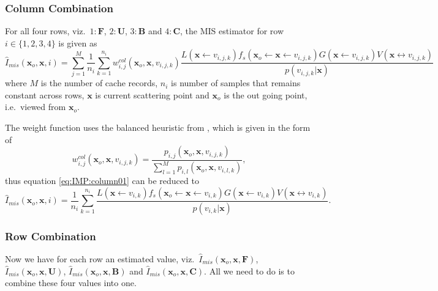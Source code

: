 \documentclass[]{book}
\begin{document}
\subsubsection*{Column Combination}
For all four rows, viz.\ $1: \boldsymbol{F}$, $2: \boldsymbol{U}$, $3: \boldsymbol{B}$ and $4: \boldsymbol{C}$, the MIS estimator for row $i \in \{1, 2, 3, 4\} $ is given as
\begin{equation}
	\widehat{I}_{mis} (\textbf{x}_o, \textbf{x}, i) = \sum_{j=1}^{M} \frac{1}{n_i}\sum_{k=1}^{n_i}w_{i,j}^{col}(\textbf{x}_o, \textbf{x}, v_{i,j,k})\frac{L(\textbf{x}\leftarrow v_{i,j,k}) f_s(\textbf{x}_o \leftarrow \textbf{x}\leftarrow v_{i,j,k}) G(\textbf{x}\leftarrow v_{i,j,k}) V(\textbf{x}\leftrightarrow v_{i,j,k})}{p(v_{i,j,k}|\textbf{x})}
	\label{eq:IMP:column01}
\end{equation}
where $M$ is the number of cache records, $n_i$ is number of samples that remains constant across rows, $\textbf{x}$ is current scattering point and $\textbf{x}_o$ is the out going point, i.e.\ viewed from $\textbf{x}_o$.

The weight function uses the balanced heuristic from \cite{veach1995MIS}, which is given in the form of 
\begin{equation*}
	w_{i,j}^{col}(\textbf{x}_o, \textbf{x}, v_{i,j,k}) = \frac{p_{i,j}(\textbf{x}_o, \textbf{x}, v_{i,j,k})}{\sum_{l=1}^{M}p_{i,l}(\textbf{x}_o, \textbf{x}, v_{i,l,k})},
\end{equation*}
thus equation \ref{eq:IMP:column01} can be reduced to
\begin{equation}
	\widehat{I}_{mis} (\textbf{x}_o, \textbf{x}, i) = \frac{1}{n_i} \sum_{k=1}^{n_i} \frac{L(\textbf{x}\leftarrow v_{i,k}) f_s(\textbf{x}_o \leftarrow \textbf{x}\leftarrow v_{i,k}) G(\textbf{x}\leftarrow v_{i,k}) V(\textbf{x}\leftrightarrow v_{i,k})}{p(v_{i,k}|\textbf{x})}.
\label{eq:IMP:column02}
\end{equation}

\subsubsection*{Row Combination}
Now we have for each row an estimated value, viz.\ $\widehat{I}_{mis} (\textbf{x}_o, \textbf{x}, \boldsymbol{F})$, $\widehat{I}_{mis} (\textbf{x}_o, \textbf{x}, \boldsymbol{U})$, $\widehat{I}_{mis} (\textbf{x}_o, \textbf{x}, \boldsymbol{B})$ and $\widehat{I}_{mis} (\textbf{x}_o, \textbf{x}, \boldsymbol{C})$.
All we need to do is to combine these four values into one.
\end{document}
